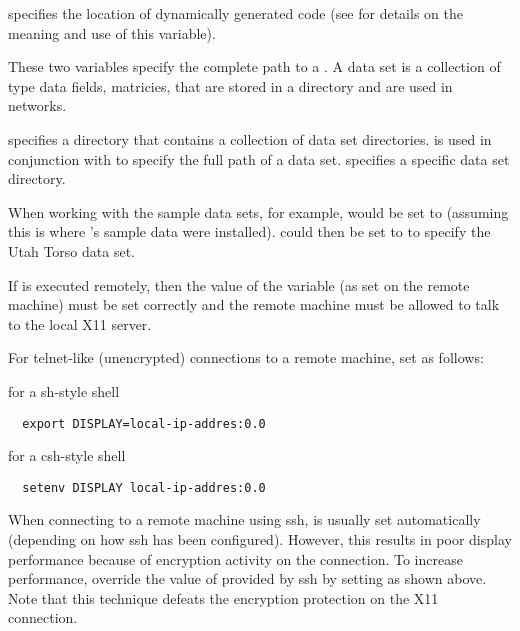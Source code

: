 \begin{description}
   specifies the location of
  dynamically generated code (see  for details on the meaning and use of
  this variable).
  
    These
  two variables specify the complete path to a \sr{} .
  A data set is a collection of \sr{} type data  fields,
  matricies, \etc{} that are stored in a directory and are used in
  \sr{} networks.

   specifies a directory that contains a
  collection of data set directories.   is used in
  conjunction with  to specify the full path of
  a data set.   specifies a specific data set
  directory. 

  When working with the sample \sr{} data sets, for example,
   would be set to
   (assuming this is where \sr{}'s
  sample data were installed).   could then be
  set to  to specify the Utah Torso data set.
  
   If \sr{} is executed remotely, then the value of
  the  variable (as set on the remote machine) must be
  set correctly and the remote machine must be allowed to talk to the
  local X11 server.
  
  For telnet-like (unencrypted) connections to a remote machine,
 set  as follows:

for a sh-style shell

\begin{verbatim}
  export DISPLAY=local-ip-addres:0.0
\end{verbatim}
  
for a csh-style shell

\begin{verbatim}
  setenv DISPLAY local-ip-addres:0.0
\end{verbatim}

  When connecting to a remote machine using ssh,  is
  usually set automatically (depending on how ssh has been
  configured).  However, this results in poor display performance
  because of encryption activity on the connection.  To increase
  performance, override the value of  provided
  by ssh by setting   as
  shown above.  Note that this technique defeats the encryption
  protection on the X11 connection.


\end{description}
